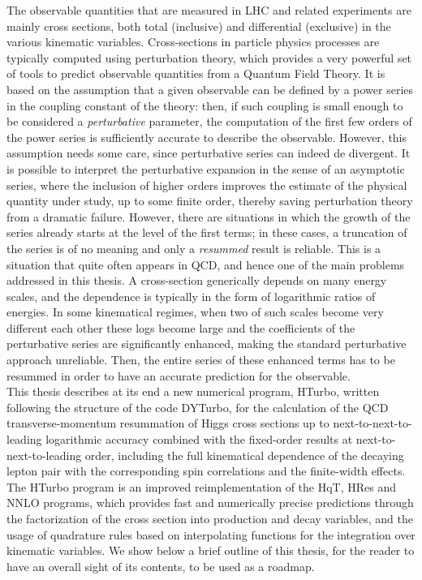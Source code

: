\documentclass[12pt]{article}
\begin{document}
The observable quantities that are measured in LHC and related experiments are mainly cross sections, both total (inclusive) and differential (exclusive) in the various kinematic variables. Cross-sections in particle physics processes are typically computed using perturbation theory, which provides a very powerful set of tools to predict observable quantities from a Quantum Field Theory. It is based on the assumption that a given observable can be defined by a power series in the coupling constant of the theory: then, if such coupling is small enough to be considered a \textit{perturbative} parameter, the computation of the first few orders of the power series is sufficiently accurate to describe the observable. However, this assumption needs some care, since perturbative series can indeed de divergent. It is possible to interpret the perturbative expansion in the sense of an asymptotic series, where the inclusion of higher orders improves the estimate of the physical quantity under study, up to some finite order, thereby saving perturbation theory from a dramatic failure. However, there are situations in which the growth of the series already starts at the level of the first terms; in these cases, a truncation of the series is of no meaning and only a \textit{resummed} result is reliable. This is a situation that quite often appears in QCD, and hence one of the main problems addressed in this thesis. A cross-section generically depends on many energy scales, and the dependence is typically in the form of logarithmic ratios of energies. In some kinematical regimes, when two of such scales become very different each other these logs become large and the coefficients of the perturbative series are significantly enhanced, making the standard perturbative approach unreliable. Then, the entire series of these enhanced terms has to be resummed in order to have an accurate prediction for the observable.\\

This thesis describes at its end a new numerical program, HTurbo, written following the structure of the code DYTurbo, for the calculation of the QCD transverse-momentum resummation of Higgs cross sections up to next-to-next-to-leading logarithmic accuracy combined with the fixed-order results at next-to-next-to-leading order, including the full kinematical dependence of the decaying lepton pair with the corresponding spin correlations and the finite-width effects. The HTurbo program is an improved reimplementation of the HqT, HRes and NNLO programs, which provides fast and numerically precise predictions through the factorization of the cross section into production and decay variables, and the usage of quadrature rules based on interpolating functions for the integration over kinematic variables. We show below a brief outline of this thesis, for the reader to have an overall sight of its contents, to be used as a roadmap.	
\end{document}
